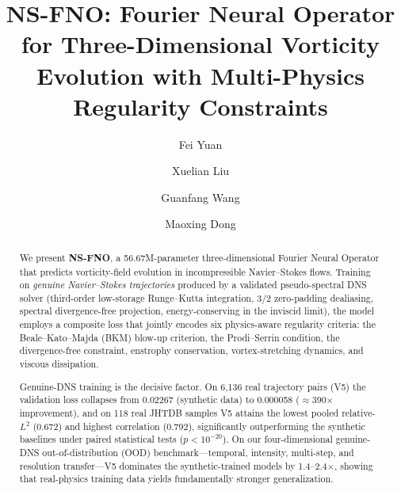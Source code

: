 \documentclass[review]{elsarticle}
\begin{document}
\begin{frontmatter}

\title{NS-FNO: Fourier Neural Operator for Three-Dimensional Vorticity Evolution with Multi-Physics Regularity Constraints}

\author[1]{Fei Yuan}
\author[2]{Xuelian Liu}
\author[1]{Guanfang Wang}
\author[3]{Maoxing Dong}


\begin{abstract}
We present \textbf{NS-FNO}, a 56.67M-parameter three-dimensional Fourier Neural Operator that
predicts vorticity-field evolution in incompressible Navier--Stokes flows. Training on
\emph{genuine Navier--Stokes trajectories} produced by a validated pseudo-spectral DNS solver
(third-order low-storage Runge--Kutta integration, 3/2 zero-padding dealiasing, spectral
divergence-free projection, energy-conserving in the inviscid limit), the model employs a
composite loss that jointly encodes six physics-aware regularity criteria: the
Beale--Kato--Majda (BKM) blow-up criterion, the Prodi--Serrin condition, the divergence-free
constraint, enstrophy conservation, vortex-stretching dynamics, and viscous dissipation.

Genuine-DNS training is the decisive factor. On 6{,}136 real trajectory pairs (V5) the
validation loss collapses from 0.02267 (synthetic data) to 0.000058 ($\approx$390$\times$
improvement), and on 118 real JHTDB samples V5 attains the lowest pooled relative-$L^2$
(0.672) and highest correlation (0.792), significantly outperforming the synthetic baselines
under paired statistical tests ($p<10^{-20}$). On our four-dimensional genuine-DNS
out-of-distribution (OOD) benchmark---temporal, intensity, multi-step, and resolution
transfer---V5 dominates the synthetic-trained models by 1.4--2.4$\times$, showing that
real-physics training data yields fundamentally stronger generalization.


\end{abstract}
\end{frontmatter}
\end{document}
